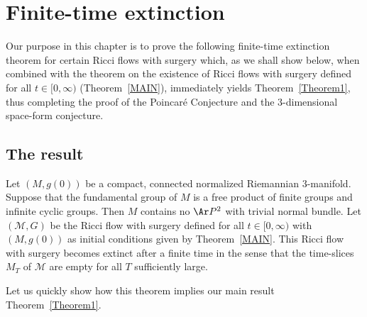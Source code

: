 \chapter{Finite-time extinction}
\label{chap:finite-time-extinction}
\label{energy}



Our purpose in this chapter is to prove the following finite-time
extinction theorem for certain Ricci flows with surgery which, as we
shall show below, when combined with the theorem on the existence of
Ricci flows with surgery defined for all $t\in [0,\infty)$
(Theorem~\ref{MAIN}), immediately yields Theorem~\ref{Theorem1},
thus completing the proof of the Poincar\'e Conjecture and the
$3$-dimensional space-form conjecture.






\section{The result}




\begin{theorem}
\label{thm:finite-time-extinction-main}
\label{extinct}
Let $(M,g(0))$ be a compact, connected normalized Riemannian $3$-manifold.
Suppose that the fundamental group of $M$ is a free product of finite groups
and infinite cyclic groups. Then $M$ contains no $\Ar P^2$ with trivial normal
bundle.  Let $({\mathcal M},G)$ be the Ricci flow with surgery defined for all
$t\in [0,\infty)$ with $(M,g(0))$ as initial conditions given by
Theorem~\ref{MAIN}. This Ricci flow with surgery becomes extinct after a finite
time in the sense that the time-slices $M_T$ of ${\mathcal M}$ are empty for
all $T$ sufficiently large.
\end{theorem}


Let us quickly show how this theorem implies our main result
Theorem~\ref{Theorem1}.

